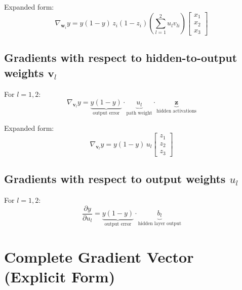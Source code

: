 \documentclass{tufte-handout}
\begin{document}
Expanded form:
\[
\nabla_{\bm{w}_i} y = y(1-y) \, z_i(1-z_i) \left(\sum_{l=1}^2 u_l v_{li}\right) 
\begin{bmatrix} x_1 \\ x_2 \\ x_3 \end{bmatrix}
\]

\subsection*{Gradients with respect to hidden-to-output weights $\bm{v}_l$}

For $l = 1,2$:
\[
\nabla_{\bm{v}_l} y = 
\underbrace{y(1-y)}_{\text{output error}} \cdot 
\underbrace{u_l}_{\text{path weight}} \cdot 
\underbrace{\bm{z}}_{\text{hidden activations}}
\]

Expanded form:
\[
\nabla_{\bm{v}_l} y = y(1-y) \, u_l 
\begin{bmatrix} z_1 \\ z_2 \\ z_3 \end{bmatrix}
\]

\subsection*{Gradients with respect to output weights $u_l$}

For $l = 1,2$:
\[
\frac{\partial y}{\partial u_l} = 
\underbrace{y(1-y)}_{\text{output error}} \cdot 
\underbrace{b_l}_{\text{hidden layer output}}
\]

\section*{Complete Gradient Vector (Explicit Form)}
\end{document}
